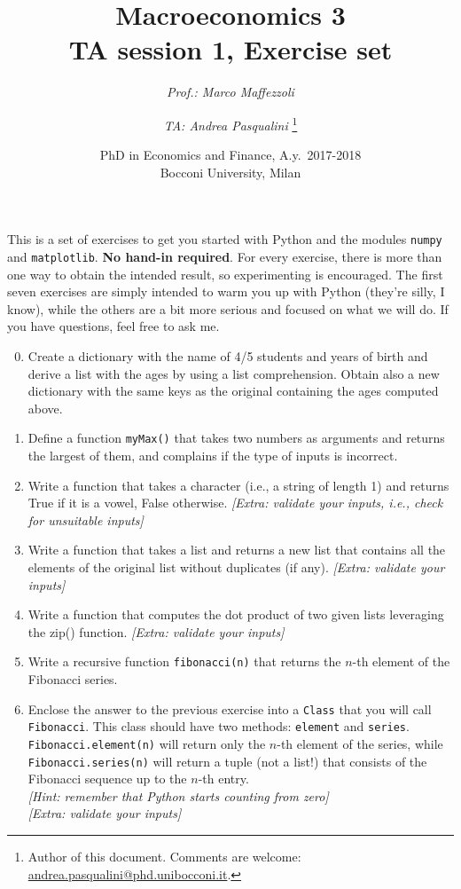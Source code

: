 \documentclass[a4paper,11pt]{article}
\author{
	\emph{Prof.: Marco Maffezzoli}
	\and
	\emph{TA: Andrea Pasqualini}%
		\thanks{
			Author of this document.
			Comments are welcome: \href{mailto:andrea.pasqualini@phd.unibocconi.it}{andrea.pasqualini@phd.unibocconi.it}.
		}
}
\title{
	\textbf{Macroeconomics 3} \\
	TA session 1, Exercise set
}
\date{
	PhD in Economics and Finance, A.y.~2017-2018 \\
	Bocconi University, Milan
}
\begin{document}
	\maketitle

	This is a set of exercises to get you started with Python and the modules \texttt{numpy} and \texttt{matplotlib}.
	\textbf{No hand-in required}.
	For every exercise, there is more than one way to obtain the intended result, so experimenting is encouraged.
	The first seven exercises are simply intended to warm you up with Python (they're silly, I know), while the others are a bit more serious and focused on what we will do.
	If you have questions, feel free to ask me.

	\begin{enumerate} \setcounter{enumi}{-1}
		\item
			Create a dictionary with the name of 4/5 students and years of birth and derive a list with the ages by using a list comprehension.
			Obtain also a new dictionary with the same keys as the original containing the ages computed above.
		
		\item
			Define a function \texttt{myMax()} that takes two numbers as arguments and returns the largest of them, and complains if the type of inputs is incorrect.
		
		\item
			Write a function that takes a character (i.e., a string of length 1) and returns True if it is a vowel, False otherwise.
			\emph{[Extra: validate your inputs, i.e., check for unsuitable inputs]}
		
		\item
			Write a function that takes a list and returns a new list that contains all the elements of the original list without duplicates (if any).
			\emph{[Extra: validate your inputs]}
		
		\item
			Write a function that computes the dot product of two given lists leveraging the zip() function.
			\emph{[Extra: validate your inputs]}
		
		\item
			Write a recursive function \texttt{fibonacci(n)} that returns the $n$-th element of the Fibonacci series.
		
		\item
			Enclose the answer to the previous exercise into a \texttt{Class} that you will call \texttt{Fibonacci}.
			This class should have two methods: \texttt{element} and \texttt{series}.
			\texttt{Fibonacci.element(n)} will return only the $n$-th element of the series, while \texttt{Fibonacci.series(n)} will return a tuple (not a list!) that consists of the Fibonacci sequence up to the $n$-th entry. \\
			\emph{[Hint: remember that Python starts counting from zero]} \\
			\emph{[Extra: validate your inputs]}
		

\end{enumerate}
\end{document}
